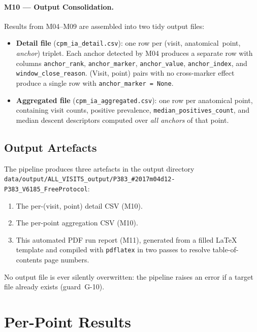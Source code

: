 \documentclass[a4paper,11pt]{article}
\begin{document}
\paragraph{M10 --- Output Consolidation.}
Results from M04--M09 are assembled into two tidy output files:
\begin{itemize}
  \item \textbf{Detail file} (\texttt{cpm\_ia\_detail.csv}): one row per
        (visit, anatomical~point, \emph{anchor}) triplet. Each anchor detected by M04
        produces a separate row with columns \texttt{anchor\_rank},
        \texttt{anchor\_marker}, \texttt{anchor\_value}, \texttt{anchor\_index},
        and \texttt{window\_close\_reason}.
        (Visit, point) pairs with no cross-marker effect produce a single row with
        \texttt{anchor\_marker = None}.
  \item \textbf{Aggregated file} (\texttt{cpm\_ia\_aggregated.csv}): one row per
        anatomical point, containing visit counts, positive prevalence,
        \texttt{median\_positives\_count}, and median descent descriptors computed over
        \emph{all anchors} of that point.
\end{itemize}

\subsection{Output Artefacts}

The pipeline produces three artefacts in the output directory \texttt{data/output/ALL\_VISITS\_output/P383\_\#2017m04d12-P383\_V6185\_FreeProtocol}:
\begin{enumerate}
  \item The per-(visit, point) detail CSV (M10).
  \item The per-point aggregation CSV (M10).
  \item This automated PDF run report (M11), generated from a filled \LaTeX{} template
        and compiled with \texttt{pdflatex} in two passes to resolve table-of-contents
        page numbers.
\end{enumerate}
No output file is ever silently overwritten: the pipeline raises an error if a target
file already exists (guard~G-10).

\section{Per-Point Results}
\end{document}
